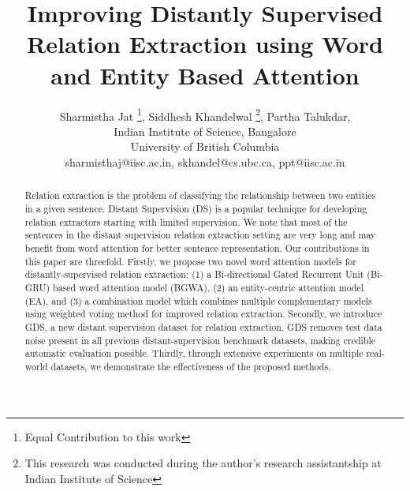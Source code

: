 \documentclass{article}
\begin{document}
\title{Improving Distantly Supervised Relation Extraction using Word and Entity Based Attention}
\author{
Sharmistha Jat \thanks{Equal Contribution to this work}, 
Siddhesh Khandelwal \footnotemark[1] \thanks{This research was conducted during the author’s research assistantship at Indian Institute of Science}, 
Partha Talukdar, 
\\ 
 Indian Institute of Science, Bangalore \\
 University of British Columbia\\
sharmisthaj@iisc.ac.in,
skhandel@cs.ubc.ca,
ppt@iisc.ac.in
}
\setlength\titlebox{2.5in}
\maketitle


\newcommand{\refalg}[1]{Algorithm~\ref{#1}}
\newcommand{\refeqn}[1]{Equation~\ref{#1}}
\newcommand{\reffig}[1]{Figure~\ref{#1}}
\newcommand{\reftbl}[1]{Table~\ref{#1}}
\newcommand{\refsec}[1]{Section~\ref{#1}}
\newcommand{\method}[1]{\mbox{\textsc{#1}}}
\newcommand{\reminder}[1]{}





\newcommand{\systemwa}{BGWA}
\newcommand{\systemwafull}{Bi-GRU Word Attention}

\newcommand{\systemea}{EA}
\newcommand{\systemeafull}{Entity Attention}

\newcommand{\newdataset}{Google Distant Supervision}
\newcommand{\newdatasetshort}{GDS} 
\begin{abstract}
Relation extraction is the problem of classifying the relationship between two entities in a given sentence. Distant Supervision (DS) is a popular technique for developing relation extractors starting with limited supervision. We note that most of the sentences in the distant supervision relation extraction setting are very long and may benefit from word attention for better sentence representation. Our contributions in this paper are threefold. Firstly, we propose two novel word attention models for distantly-supervised relation extraction: (1) a Bi-directional Gated Recurrent Unit (Bi-GRU) based word attention model (\systemwa{}), (2) an entity-centric attention model (\systemea{}), and (3) a combination model which combines multiple complementary models using weighted voting method for improved relation extraction. Secondly, we introduce \newdatasetshort{}, a new distant supervision dataset for relation extraction. \newdatasetshort{} removes test data noise present in all previous distant-supervision benchmark datasets, making credible automatic evaluation possible. Thirdly, through extensive experiments on multiple real-world datasets, we demonstrate the effectiveness of the proposed methods. \end{abstract}
\end{document}

